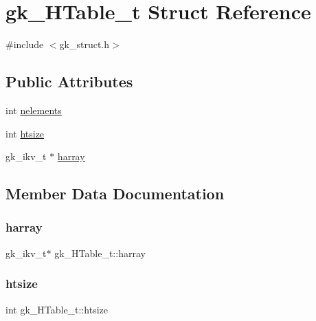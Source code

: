 \hypertarget{a00650}{}\section{gk\+\_\+\+H\+Table\+\_\+t Struct Reference}
\label{a00650}


{\ttfamily \#include $<$gk\+\_\+struct.\+h$>$}

\subsection*{Public Attributes}
\begin{DoxyCompactItemize}
\item 
int \hyperlink{a00650_a71acd4583496d0d4c5cb8dfbaaf478a7}{nelements}
\item 
int \hyperlink{a00650_a134c8b357760d77876779e8c6d5eba13}{htsize}
\item 
gk\+\_\+ikv\+\_\+t $\ast$ \hyperlink{a00650_a9e7cc6e92493a91c2cbf8b953e72b235}{harray}
\end{DoxyCompactItemize}


\subsection{Member Data Documentation}
\mbox{\label{a00650_a9e7cc6e92493a91c2cbf8b953e72b235}} 
\subsubsection{\texorpdfstring{harray}{harray}}
{\footnotesize\ttfamily gk\+\_\+ikv\+\_\+t$\ast$ gk\+\_\+\+H\+Table\+\_\+t\+::harray}

\mbox{\label{a00650_a134c8b357760d77876779e8c6d5eba13}} 
\subsubsection{\texorpdfstring{htsize}{htsize}}
{\footnotesize\ttfamily int gk\+\_\+\+H\+Table\+\_\+t\+::htsize}

\mbox{\label{a00650_a71acd4583496d0d4c5cb8dfbaaf478a7}} 

